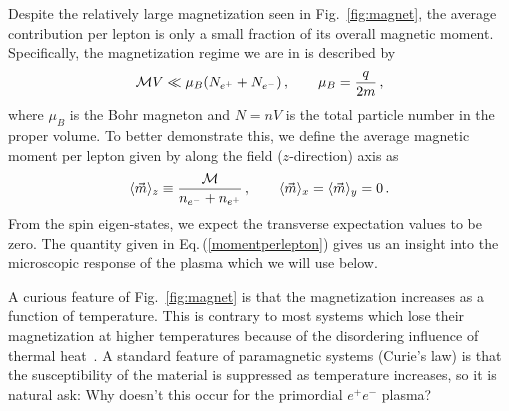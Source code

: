 \documentclass[a4paper]{article}
\newcommand{\req}[1]{Eq.\,(\ref{#1})}
\newcommand{\rf}[1]{Fig.~{\ref{#1}}}
\begin{document}
Despite the relatively large magnetization seen in \rf{fig:magnet}, the average contribution per lepton is only a small fraction of its overall magnetic moment. Specifically, the magnetization regime we are in is described by
\begin{align}
    \label{fractionalmagnetization}
    {\cal M}V\ll\mu_{B}(N_{e^{+}}+N_{e^{-}})\,,\qquad\mu_{B}=\frac{q}{2m}\,,
\end{align}
where $\mu_{B}$ is the Bohr magneton and $N=nV$ is the total particle number in the proper volume. To better demonstrate this, we define the average magnetic moment per lepton given by along the field ($z$-direction) axis as
\begin{align}
    \label{momentperlepton}
    \langle\vec{m}\rangle_{z}\equiv\frac{{\cal M}}{n_{e^{-}}+n_{e^{+}}}\,,\qquad\langle\vec{m}\rangle_{x}=\langle\vec{m}\rangle_{y}=0\,.
\end{align}
From the spin eigen-states, we expect the transverse expectation values to be zero. The quantity given in \req{momentperlepton} gives us an insight into the microscopic response of the plasma which we will use below.

A curious feature of \rf{fig:magnet} is that the magnetization increases as a function of temperature. This is contrary to most systems which lose their magnetization at higher temperatures because of the disordering influence of thermal heat~\cite{huang1991statistical}. A standard feature of paramagnetic systems (Curie's law) is that the susceptibility of the material is suppressed as temperature increases, so it is natural ask: Why doesn't this occur for the primordial $e^{+}e^{-}$ plasma?
\end{document}
